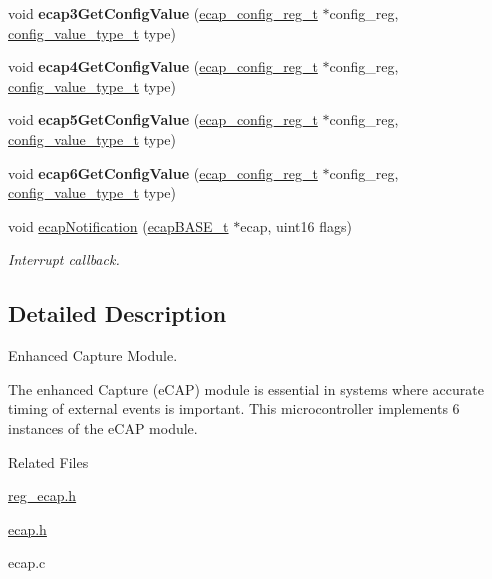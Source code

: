 \begin{DoxyCompactItemize}
void {\bfseries ecap3\+Get\+Config\+Value} (\mbox{\hyperlink{structecap__config__reg}{ecap\+\_\+config\+\_\+reg\+\_\+t}} $\ast$config\+\_\+reg, \mbox{\hyperlink{sys__common_8h_a9daf9a5992391b058477d28d107ee5e2}{config\+\_\+value\+\_\+type\+\_\+t}} type)
\item 
\mbox{\label{group__eCAP_ga01ba51b76ea5adfa5f1287e7c514e464}} 
void {\bfseries ecap4\+Get\+Config\+Value} (\mbox{\hyperlink{structecap__config__reg}{ecap\+\_\+config\+\_\+reg\+\_\+t}} $\ast$config\+\_\+reg, \mbox{\hyperlink{sys__common_8h_a9daf9a5992391b058477d28d107ee5e2}{config\+\_\+value\+\_\+type\+\_\+t}} type)
\item 
\mbox{\label{group__eCAP_ga7cd9c6ad19113e6e0cfbbe1fae72474b}} 
void {\bfseries ecap5\+Get\+Config\+Value} (\mbox{\hyperlink{structecap__config__reg}{ecap\+\_\+config\+\_\+reg\+\_\+t}} $\ast$config\+\_\+reg, \mbox{\hyperlink{sys__common_8h_a9daf9a5992391b058477d28d107ee5e2}{config\+\_\+value\+\_\+type\+\_\+t}} type)
\item 
\mbox{\label{group__eCAP_gab3cc58b1f07d3a1b4a67976734f4e49a}} 
void {\bfseries ecap6\+Get\+Config\+Value} (\mbox{\hyperlink{structecap__config__reg}{ecap\+\_\+config\+\_\+reg\+\_\+t}} $\ast$config\+\_\+reg, \mbox{\hyperlink{sys__common_8h_a9daf9a5992391b058477d28d107ee5e2}{config\+\_\+value\+\_\+type\+\_\+t}} type)
\item 
void \mbox{\hyperlink{group__eCAP_ga9afc72752bc733e801d52ca015d38974}{ecap\+Notification}} (\mbox{\hyperlink{reg__ecap_8h_a8ca3ed15315b354b71b837ed4b6685a9}{ecap\+B\+A\+S\+E\+\_\+t}} $\ast$ecap, uint16 flags)
\begin{DoxyCompactList}\small\item\em Interrupt callback. \end{DoxyCompactList}\end{DoxyCompactItemize}


\subsection{Detailed Description}
Enhanced Capture Module. 

The enhanced Capture (e\+C\+AP) module is essential in systems where accurate timing of external events is important. This microcontroller implements 6 instances of the e\+C\+AP module.

Related Files
\begin{DoxyItemize}
\item \mbox{\hyperlink{reg__ecap_8h}{reg\+\_\+ecap.\+h}}
\item \mbox{\hyperlink{ecap_8h}{ecap.\+h}}
\item ecap.\+c 
\end{DoxyItemize}

